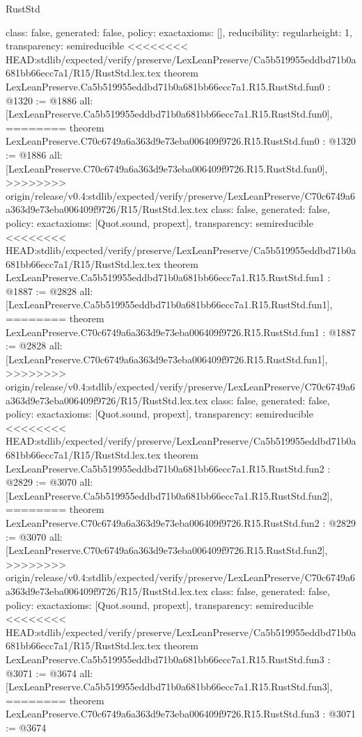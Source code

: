 \begin{lexlean}{RustStd}
\begin{coremodule}
{\begin{coremodule}
{{{  class: false,
  generated: false,
  policy: exact{axioms: []},
  reducibility: regular{height: 1},
  transparency: semireducible
}
<<<<<<<< HEAD:stdlib/expected/verify/preserve/LexLeanPreserve/Ca5b519955eddbd71b0a681bb66ecc7a1/R15/RustStd.lex.tex
theorem LexLeanPreserve.Ca5b519955eddbd71b0a681bb66ecc7a1.R15.RustStd.fun0 : @1320 := @1886 {
  all: [LexLeanPreserve.Ca5b519955eddbd71b0a681bb66ecc7a1.R15.RustStd.fun0],
========
theorem LexLeanPreserve.C70c6749a6a363d9e73eba006409f9726.R15.RustStd.fun0 : @1320 := @1886 {
  all: [LexLeanPreserve.C70c6749a6a363d9e73eba006409f9726.R15.RustStd.fun0],
>>>>>>>> origin/release/v0.4:stdlib/expected/verify/preserve/LexLeanPreserve/C70c6749a6a363d9e73eba006409f9726/R15/RustStd.lex.tex
  class: false,
  generated: false,
  policy: exact{axioms: [Quot.sound, propext]},
  transparency: semireducible
}
<<<<<<<< HEAD:stdlib/expected/verify/preserve/LexLeanPreserve/Ca5b519955eddbd71b0a681bb66ecc7a1/R15/RustStd.lex.tex
theorem LexLeanPreserve.Ca5b519955eddbd71b0a681bb66ecc7a1.R15.RustStd.fun1 : @1887 := @2828 {
  all: [LexLeanPreserve.Ca5b519955eddbd71b0a681bb66ecc7a1.R15.RustStd.fun1],
========
theorem LexLeanPreserve.C70c6749a6a363d9e73eba006409f9726.R15.RustStd.fun1 : @1887 := @2828 {
  all: [LexLeanPreserve.C70c6749a6a363d9e73eba006409f9726.R15.RustStd.fun1],
>>>>>>>> origin/release/v0.4:stdlib/expected/verify/preserve/LexLeanPreserve/C70c6749a6a363d9e73eba006409f9726/R15/RustStd.lex.tex
  class: false,
  generated: false,
  policy: exact{axioms: [Quot.sound, propext]},
  transparency: semireducible
}
<<<<<<<< HEAD:stdlib/expected/verify/preserve/LexLeanPreserve/Ca5b519955eddbd71b0a681bb66ecc7a1/R15/RustStd.lex.tex
theorem LexLeanPreserve.Ca5b519955eddbd71b0a681bb66ecc7a1.R15.RustStd.fun2 : @2829 := @3070 {
  all: [LexLeanPreserve.Ca5b519955eddbd71b0a681bb66ecc7a1.R15.RustStd.fun2],
========
theorem LexLeanPreserve.C70c6749a6a363d9e73eba006409f9726.R15.RustStd.fun2 : @2829 := @3070 {
  all: [LexLeanPreserve.C70c6749a6a363d9e73eba006409f9726.R15.RustStd.fun2],
>>>>>>>> origin/release/v0.4:stdlib/expected/verify/preserve/LexLeanPreserve/C70c6749a6a363d9e73eba006409f9726/R15/RustStd.lex.tex
  class: false,
  generated: false,
  policy: exact{axioms: [Quot.sound, propext]},
  transparency: semireducible
}
<<<<<<<< HEAD:stdlib/expected/verify/preserve/LexLeanPreserve/Ca5b519955eddbd71b0a681bb66ecc7a1/R15/RustStd.lex.tex
theorem LexLeanPreserve.Ca5b519955eddbd71b0a681bb66ecc7a1.R15.RustStd.fun3 : @3071 := @3674 {
  all: [LexLeanPreserve.Ca5b519955eddbd71b0a681bb66ecc7a1.R15.RustStd.fun3],
========
theorem LexLeanPreserve.C70c6749a6a363d9e73eba006409f9726.R15.RustStd.fun3 : @3071 := @3674 {
}}}}}}}
\end{coremodule}}
\end{coremodule}
\end{lexlean}
